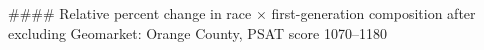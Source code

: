 #### Relative percent change in race × first-generation composition after excluding Geomarket: Orange County, PSAT score 1070–1180
